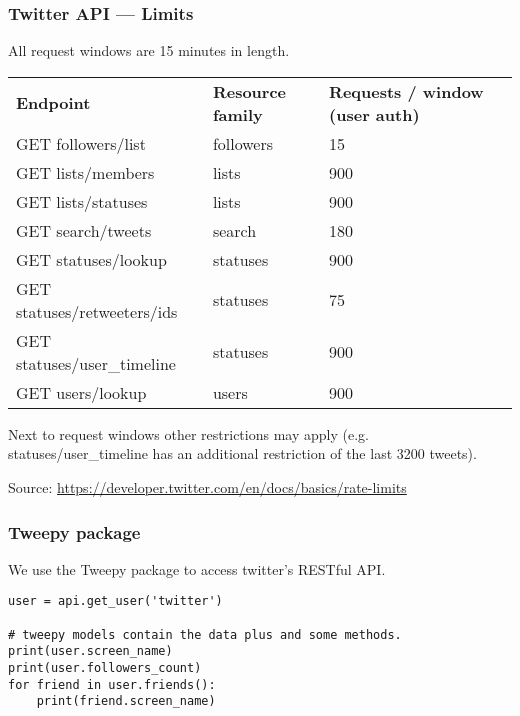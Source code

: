 \begin{frame}
    \frametitle{Twitter API --- Limits}

    All request windows are 15 minutes in length.

    \begin{table}[]
        \footnotesize
        \begin{tabular}{llll}
          \textbf{Endpoint}           & \textbf{Resource family} & \textbf{Requests / window (user auth)} \\
          GET followers/list          & followers                & 15                                     \\
          GET lists/members           & lists                    & 900                                    \\
          GET lists/statuses          & lists                    & 900                                    \\
          GET search/tweets           & search                   & 180                                    \\
          GET statuses/lookup         & statuses                 & 900                                    \\
          GET statuses/retweeters/ids & statuses                 & 75                                     \\
          GET statuses/user\_timeline & statuses                 & 900                                    \\
          GET users/lookup            & users                    & 900                                    \\
        \end{tabular}
    \end{table}

    Next to request windows other restrictions may
    apply (e.g. statuses/user\_timeline has an additional restriction of
    the last 3200 tweets).

    Source: \href{https://developer.twitter.com/en/docs/basics/rate-limits}{https://developer.twitter.com/en/docs/basics/rate-limits}
\end{frame}

\begin{frame}[fragile]
    \frametitle{Tweepy package}

    We use the Tweepy package to access twitter's RESTful API.

\begin{verbatim}
user = api.get_user('twitter')

# tweepy models contain the data plus and some methods.
print(user.screen_name)
print(user.followers_count)
for friend in user.friends():
    print(friend.screen_name)
\end{verbatim}

\end{frame}

